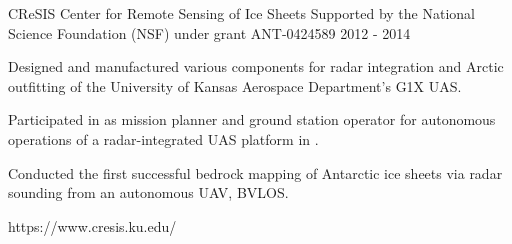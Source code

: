 \begin{cventries}
\cvprojwideentry
  	{CReSIS} %
  	{Center for Remote Sensing of Ice Sheets} %
    {Supported by the National Science Foundation (NSF) under grant ANT-0424589} %
    {2012 - 2014} %
    {
      \begin{cvitems} %
        \item {Designed and manufactured various components for radar integration and Arctic outfitting of the University of Kansas Aerospace Department's G1X UAS.}
        \item {Participated in  as mission planner and ground station operator for autonomous operations of a radar-integrated UAS platform in .}
        \item {Conducted the first successful bedrock mapping of Antarctic ice sheets via radar sounding from an autonomous UAV, BVLOS.}
      \end{cvitems}
    } %
    {https://www.cresis.ku.edu/} %
    {\showprojectdescriptions}
    
\end{cventries}
